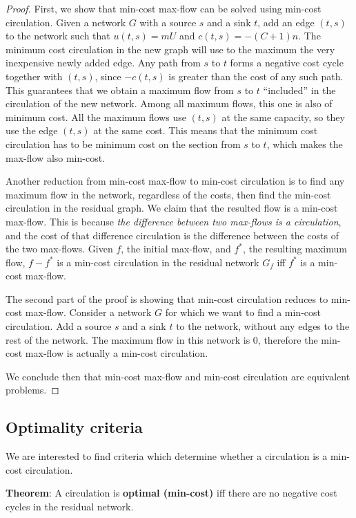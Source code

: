 \documentclass{article}
\begin{document}
\begin{proof}
First, we show that min-cost max-flow can be solved using min-cost circulation. Given a network $G$ with a source $s$ and a sink $t$, add an edge $(t, s)$ to the network such that $u(t, s) = mU$ and $c(t, s) = -(C+1)n$. The minimum cost circulation in the new graph will use to the maximum the very inexpensive newly added edge. Any path from $s$ to $t$ forms a negative cost cycle together with $(t, s)$, since $-c(t, s)$ is greater than the cost of any such path. This guarantees that we obtain a maximum flow from $s$ to $t$ ``included'' in the circulation of the new network. Among all maximum flows, this one is also of minimum cost. All the maximum flows use $(t, s)$ at the same capacity, so they use the edge $(t, s)$ at the same cost. This means that the minimum cost circulation has to be minimum cost on the section from $s$ to $t$, which makes the max-flow also min-cost.  

Another reduction from min-cost max-flow to min-cost circulation is to find any maximum flow in the network, regardless of the costs, then find the min-cost circulation in the residual graph. We claim that the resulted flow is a min-cost max-flow. This is because \emph{the difference between two max-flows is a circulation}, and the cost of that difference circulation is the difference between the costs of the two max-flows. Given $f$, the initial max-flow, and $f^*$, the resulting maximum flow, $f-f^*$ is a min-cost circulation in the residual network $G_f$ iff $f^*$ is a min-cost max-flow. 

The second part of the proof is showing that min-cost circulation reduces to min-cost max-flow. Consider a network $G$ for which we want to find a min-cost circulation. Add a source $s$ and a sink $t$ to the network, without any edges to the rest of the network. The maximum flow in this network is 0, therefore the min-cost max-flow is actually a min-cost circulation. 

We conclude then that min-cost max-flow and min-cost circulation are equivalent problems. 
\end{proof}

\subsection{Optimality criteria}

We are interested to find criteria which determine whether a circulation is a min-cost circulation.

\textbf{Theorem}:
    A circulation is {\bf optimal (min-cost)} iff there are no negative cost cycles in the residual network.
\end{document}
